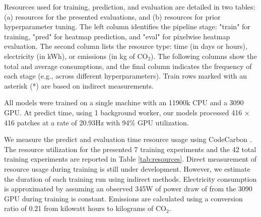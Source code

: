 \documentclass[10pt,twocolumn,letterpaper]{article}
\newcommand{\cotwo}{\ensuremath{\mathrm{CO_2}}}
\begin{document}
\begin{table}[t]
{Resources used for training, prediction, and evaluation are detailed in two tables:
(a) resources for the presented evaluations, and (b) resources for prior hyperparameter tuning.
The left column identifies the pipeline stage:
"train" for training, "pred" for heatmap prediction, and "eval" for pixelwise heatmap evaluation.
The second column lists the resource type: time (in days or hours), electricity (in kWh), or emissions (in
  kg of \cotwo{}).
The following columns show the total and average consumptions, and the final column indicates the
  frequency of each stage (e.g., across different hyperparameters).
Train rows marked with an asterisk (*) are based on indirect measurements.
}
\end{table}

All models were trained on a single machine with an 11900k CPU and a 3090 GPU.
At predict time, using 1 background worker, our models processed 416 $\times$
416 patches at a rate of 20.93Hz with 94\% GPU utilization.

We measure the predict and evaluation time resource usage using CodeCarbon
\cite{lacoste2019codecarbon}.
The resource utilization for the presented 7 training experiments and the 42
total training experiments are reported in
Table \ref{tab:resources}.
Direct measurement of resource usage during training is still under
development. However, we estimate the duration of each training run using
indirect methods. Electricity consumption is approximated by assuming an
observed 345W of power draw of from the 3090 GPU during training is constant.
Emissions are calculated using a conversion ratio of 0.21 from kilowatt hours
to kilograms of \cotwo{}.
\end{document}

